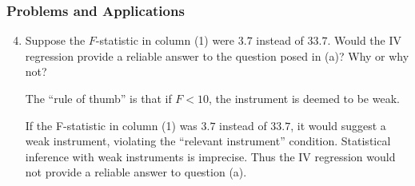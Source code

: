\begin{frame}
\frametitle{Problems and Applications}

\begin{enumerate}\setcounter{enumi}{3}

\item Suppose the $F$-statistic in column (1) were $3.7$ instead of $33.7$. Would the IV regression provide a reliable answer to the question posed in (a)? Why or why not?

\begin{answer}
The ``rule of thumb'' is that if $F<10$, the instrument is deemed to be weak. 

If the F-statistic in column (1) was $3.7$ instead of $33.7$, it would suggest a weak instrument, violating the ``relevant instrument'' condition. Statistical inference with weak instruments is imprecise. Thus the IV regression would not provide a reliable answer to question (a).
\end{answer}

\end{enumerate}

\end{frame}



